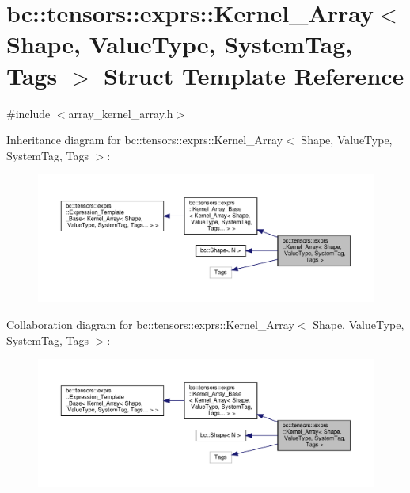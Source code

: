 \hypertarget{structbc_1_1tensors_1_1exprs_1_1Kernel__Array}{}\section{bc\+:\+:tensors\+:\+:exprs\+:\+:Kernel\+\_\+\+Array$<$ Shape, Value\+Type, System\+Tag, Tags $>$ Struct Template Reference}
\label{structbc_1_1tensors_1_1exprs_1_1Kernel__Array}


{\ttfamily \#include $<$array\+\_\+kernel\+\_\+array.\+h$>$}



Inheritance diagram for bc\+:\+:tensors\+:\+:exprs\+:\+:Kernel\+\_\+\+Array$<$ Shape, Value\+Type, System\+Tag, Tags $>$\+:\nopagebreak
\begin{figure}[H]
\begin{center}
\leavevmode
\includegraphics[width=350pt]{structbc_1_1tensors_1_1exprs_1_1Kernel__Array__inherit__graph}
\end{center}
\end{figure}


Collaboration diagram for bc\+:\+:tensors\+:\+:exprs\+:\+:Kernel\+\_\+\+Array$<$ Shape, Value\+Type, System\+Tag, Tags $>$\+:\nopagebreak
\begin{figure}[H]
\begin{center}
\leavevmode
\includegraphics[width=350pt]{structbc_1_1tensors_1_1exprs_1_1Kernel__Array__coll__graph}
\end{center}
\end{figure}
